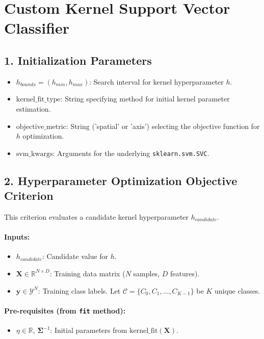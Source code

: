\documentclass{article}
\newcommand{\mat}[1]{\mathbf{#1}} %
\newcommand{\vecbf}[1]{\bm{#1}} %
\begin{document}
\section*{Custom Kernel Support Vector Classifier}

\subsection*{1. Initialization Parameters}
\begin{itemize}
    \item $h_{bounds} = (h_{min}, h_{max})$: Search interval for kernel hyperparameter $h$.
    \item $\text{kernel\_fit\_type}$: String specifying method for initial kernel parameter estimation.
    \item $\text{objective\_metric}$: String ('spatial' or 'axis') selecting the objective function for $h$ optimization.
    \item $\text{svm\_kwargs}$: Arguments for the underlying \texttt{sklearn.svm.SVC}.
\end{itemize}

\subsection*{2. Hyperparameter Optimization Objective Criterion}
This criterion evaluates a candidate kernel hyperparameter $h_{candidate}$.

\paragraph{Inputs:}
\begin{itemize}
    \item $h_{candidate}$: Candidate value for $h$.
    \item $\mat{X} \in \mathbb{R}^{N \times D}$: Training data matrix ($N$ samples, $D$ features).
    \item $\vecbf{y} \in \mathcal{Y}^N$: Training class labels. Let $\mathcal{C} = \{C_0, C_1, \dots, C_{K-1}\}$ be $K$ unique classes.
\end{itemize}

\paragraph{Pre-requisites (from \texttt{fit} method):}
\begin{itemize}
    \item $\eta \in \mathbb{R}$, $\mat{\Sigma}^{-1}$: Initial parameters from $\text{kernel\_fit}(\mat{X})$.
\end{itemize}
\end{document}
